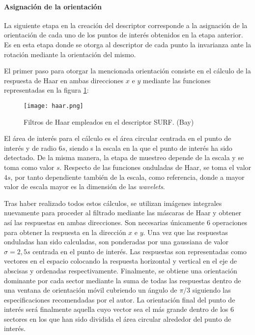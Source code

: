 \paragraph{Asignación de la orientación} 
La siguiente etapa en la creación del descriptor corresponde a la asignación de la orientación de cada uno de los puntos de interés obtenidos en la etapa anterior.
Es en esta etapa donde se otorga al descriptor de cada punto la invarianza ante la rotación mediante la orientación del mismo. 

El primer paso para otorgar la mencionada orientación consiste en el cálculo de la respuesta de Haar en ambas direcciones $x$ e $y$ mediante las funciones representadas en la figura \ref{fig:haar}:

\begin{figure}
  \centering        
  \texttt{[image: haar.png]}
  \caption{Filtros de Haar empleados en el descriptor SURF. (Bay)}
  \label{fig:haar}
\end{figure}

El área de interés para el cálculo es el área circular centrada en el punto de interés y de radio $6s$, siendo s la escala en la que el punto de interés ha sido detectado. De la misma manera, la etapa de muestreo depende de la escala y se toma como valor $s$. Respecto de las funciones onduladas de Haar, se toma el valor $4s$, por tanto dependiente también de la escala, como referencia, donde a mayor valor de escala mayor es la dimensión de las \emph{wavelets}.

Tras haber realizado todos estos cálculos, se utilizan imágenes integrales nuevamente para proceder al filtrado mediante las máscaras de Haar y obtener así las respuestas en ambas direcciones. Son necesarias únicamente 6 operaciones para obtener la respuesta en la dirección $x$ e $y$. Una vez que las respuestas onduladas han sido calculadas, son ponderadas por una gaussiana de valor $\sigma = 2,5s$ centrada en el punto de interés. Las respuestas son representadas como vectores en el espacio colocando la respuesta horizontal y vertical en el eje de abscisas y ordenadas respectivamente. Finalmente, se obtiene una orientación dominante por cada sector mediante la suma de todas las respuestas dentro de una ventana de orientación móvil cubriendo un ángulo de $\pi/3$ siguiendo las especificaciones recomendadas por el autor. La orientación final del punto de interés será finalmente aquella cuyo vector sea el más grande dentro de los 6 sectores en los que han sido dividida el área circular alrededor del punto de interés. 

